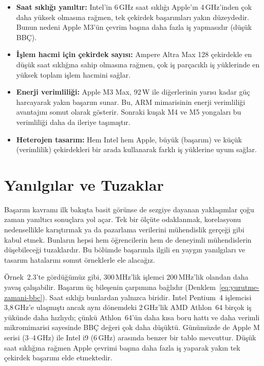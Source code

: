 \begin{itemize}
    \item \textbf{Saat sıklığı yanıltır:} Intel'in 6\,GHz saat sıklığı Apple'ın 4\,GHz'inden çok daha yüksek olmasına rağmen, tek çekirdek başarımları yakın düzeydedir. Bunun nedeni Apple M3'ün çevrim başına daha fazla iş yapmasıdır (düşük BBÇ).

    \item \textbf{İşlem hacmi için çekirdek sayısı:} Ampere Altra Max 128 çekirdekle en düşük saat sıklığına sahip olmasına rağmen, çok iş parçacıklı iş yüklerinde en yüksek toplam işlem hacmini sağlar.

    \item \textbf{Enerji verimliliği:} Apple M3 Max, 92\,W ile diğerlerinin yarısı kadar güç harcayarak yakın başarım sunar. Bu, ARM mimarisinin enerji verimliliği avantajını somut olarak gösterir. Sonraki kuşak M4 ve M5 yongaları bu verimliliği daha da ileriye taşımıştır.

    \item \textbf{Heterojen tasarım:} Hem Intel hem Apple, büyük (başarım) ve küçük (verimlilik) çekirdekleri bir arada kullanarak farklı iş yüklerine uyum sağlar.
\end{itemize}


\section{Yanılgılar ve Tuzaklar}
\label{sec:yanilgilar-tuzaklar}

Başarım kavramı ilk bakışta basit görünse de sezgiye dayanan yaklaşımlar çoğu zaman yanıltıcı sonuçlara yol açar. Tek bir ölçüte odaklanmak, korelasyonu nedensellikle karıştırmak ya da pazarlama verilerini mühendislik gerçeği gibi kabul etmek. Bunların hepsi hem öğrencilerin hem de deneyimli mühendislerin düşebileceği tuzaklardır. Bu bölümde başarımla ilgili en yaygın yanılgıları ve tasarım hatalarını somut örneklerle ele alacağız.

Örnek~2.3'te gördüğümüz gibi, 300\,MHz'lik işlemci 200\,MHz'lik olandan daha yavaş çalışabilir. Başarım üç bileşenin çarpımına bağlıdır (Denklem~\ref{eq:yurutme-zamani-bbc}). Saat sıklığı bunlardan yalnızca biridir. Intel Pentium~4 işlemcisi 3,8\,GHz'e ulaşmıştı ancak aynı dönemdeki 2\,GHz'lik AMD Athlon~64 birçok iş yükünde daha hızlıydı; çünkü Athlon~64'ün daha kısa boru hattı ve daha verimli mikromimarisi sayesinde BBÇ değeri çok daha düşüktü. Günümüzde de Apple M serisi (3--4\,GHz) ile Intel i9 (6\,GHz) arasında benzer bir tablo mevcuttur. Düşük saat sıklığına rağmen Apple çevrimi başına daha fazla iş yaparak yakın tek çekirdek başarımı elde etmektedir.

